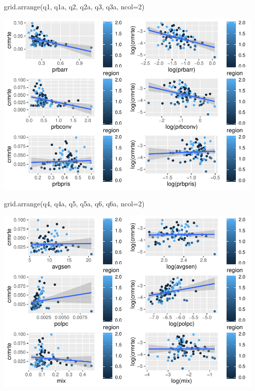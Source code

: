 \documentclass[]{article}
\newenvironment{Shaded}{}{}
\newcommand{\DataTypeTok}[1]{#1}
\newcommand{\DecValTok}[1]{#1}
\newcommand{\KeywordTok}[1]{\textcolor[rgb]{0.00,0.00,1.00}{#1}}
\newcommand{\NormalTok}[1]{#1}
\begin{document}
\begin{Shaded}
\begin{Highlighting}[]
\KeywordTok{grid.arrange}\NormalTok{(q1, q1a, q2, q2a, q3, q3a, }\DataTypeTok{ncol=}\DecValTok{2}\NormalTok{)}
\end{Highlighting}
\end{Shaded}

\includegraphics{Bagnard_Gaustad_Hartman_Leung_Lab_3_files/figure-latex/unnamed-chunk-52-1.pdf}

\begin{Shaded}
\begin{Highlighting}[]
\KeywordTok{grid.arrange}\NormalTok{(q4, q4a, q5, q5a, q6, q6a, }\DataTypeTok{ncol=}\DecValTok{2}\NormalTok{)}
\end{Highlighting}
\end{Shaded}

\includegraphics{Bagnard_Gaustad_Hartman_Leung_Lab_3_files/figure-latex/unnamed-chunk-52-2.pdf}
\end{document}
